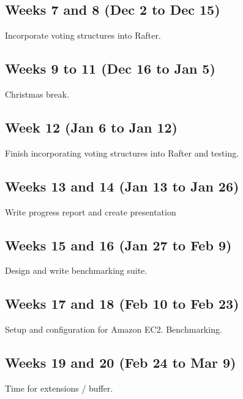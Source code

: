 \documentclass[12pt]{scrartcl}
\begin{document}
\subsection{Weeks 7 and 8 (Dec 2 to Dec 15)%
  \label{weeks-7-and-8-dec-2-to-dec-15}%
}

Incorporate voting structures into Rafter.


\subsection{Weeks 9 to 11 (Dec 16 to Jan 5)%
  \label{weeks-9-to-11-dec-16-to-jan-5}%
}

Christmas break.


\subsection{Week 12 (Jan 6 to Jan 12)%
  \label{week-12-jan-6-to-jan-12}%
}

Finish incorporating voting structures into Rafter and testing.


\subsection{Weeks 13 and 14 (Jan 13 to Jan 26)%
  \label{weeks-13-and-14-jan-13-to-jan-26}%
}

Write progress report and create presentation


\subsection{Weeks 15 and 16 (Jan 27 to Feb 9)%
  \label{weeks-15-and-16-jan-27-to-feb-9}%
}

Design and write benchmarking suite.


\subsection{Weeks 17 and 18 (Feb 10 to Feb 23)%
  \label{weeks-17-and-18-feb-10-to-feb-23}%
}

Setup and configuration for Amazon EC2. Benchmarking.


\subsection{Weeks 19 and 20 (Feb 24 to Mar 9)%
  \label{weeks-19-and-20-feb-24-to-mar-9}%
}

Time for extensions / buffer.
\end{document}
